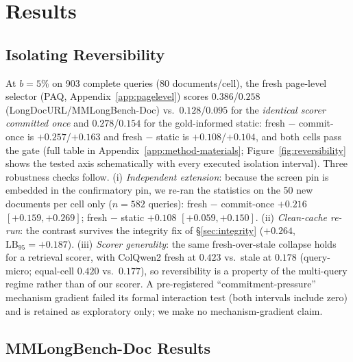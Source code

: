 \documentclass[letterpaper]{article} %
\newcommand{\paq}{\textsc{PAQ}}
\newcommand{\lb}{\mathrm{LB}_{95}}
\begin{document}
\section{Results}\label{sec:results}

\subsection{Isolating Reversibility}\label{sec:results-isolation}

At $b=5\%$ on 903 complete queries (80 documents/cell), the fresh page-level selector (\paq{}, Appendix~\ref{app:pagelevel}) scores $0.386$/$0.258$ (LongDocURL/MMLongBench-Doc) vs.\ $0.128$/$0.095$ for the \emph{identical scorer committed once} and $0.278$/$0.154$ for the gold-informed static: fresh $-$ commit-once is $+0.257$/$+0.163$ and fresh $-$ static is $+0.108$/$+0.104$, and both cells pass the gate (full table in Appendix~\ref{app:method-materials}; Figure~\ref{fig:reversibility} shows the tested axis schematically with every executed isolation interval).
Three robustness checks follow. (i) \emph{Independent extension}: because the screen pin is embedded in the confirmatory pin, we re-ran the statistics on the 50 new documents per cell only ($n=582$ queries): fresh $-$ commit-once $+0.216$ $[+0.159,+0.269]$; fresh $-$ static $+0.108$ $[+0.059,+0.150]$. (ii) \emph{Clean-cache re-run}: the contrast survives the integrity fix of \S\ref{sec:integrity} ($+0.264$, $\lb=+0.187$). (iii) \emph{Scorer generality}: the same fresh-over-stale collapse holds for a retrieval scorer, with ColQwen2 fresh at $0.423$ vs.\ stale at $0.178$ (query-micro; equal-cell $0.420$ vs.\ $0.177$), so reversibility is a property of the multi-query regime rather than of our scorer. A pre-registered ``commitment-pressure'' mechanism gradient failed its formal interaction test (both intervals include zero) and is retained as exploratory only; we make no mechanism-gradient claim.

\subsection{MMLongBench-Doc Results}\label{sec:results-mmlo}
\end{document}
